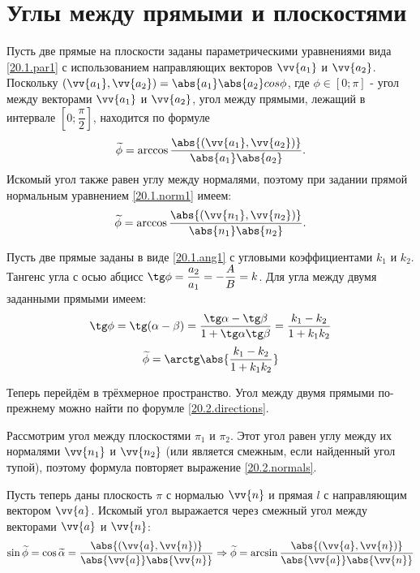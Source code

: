 \section{Углы между прямыми и плоскостями}

  Пусть две прямые на плоскости заданы параметрическими уравнениями вида \ref{20.1.par1} с использованием направляющих векторов $\vv{a_1}$ и $\vv{a_2}$. Поскольку $(\vv{a_1},\vv{a_2})=\abs{a_1}\abs{a_2}cos \phi$, где $\phi \in \left[0;\pi\right]$ - угол между векторами $\vv{a_1}$ и $\vv{a_2}$, угол между прямыми, лежащий в интервале $\left[0;\dfrac \pi 2\right]$, находится по формуле
  \begin{equation}\label{20.2.directions}
  \widetilde\phi=\arccos\dfrac{\abs{(\vv{a_1},\vv{a_2})}}{\abs{a_1}\abs{a_2}}.
  \end{equation}
  Искомый угол также равен углу между нормалями, поэтому при задании прямой нормальным уравнением \ref{20.1.norm1} имеем:
  \begin{equation}\label{20.2.normals}
  \widetilde\phi=\arccos\dfrac{\abs{(\vv{n_1},\vv{n_2})}}{\abs{n_1}\abs{n_2}}.
  \end{equation}
  
  Пусть две прямые заданы в виде \ref{20.1.ang1} с угловыми коэффициентами $k_1$ и $k_2$. Тангенс угла с осью абцисс $\tg \phi = \dfrac{a_2}{a_1}=-\dfrac{A}{B}=k$. Для угла между двумя заданными прямыми имеем:
  \begin{equation}
  \tg \phi=\tg (\alpha-\beta)=\dfrac{\tg \alpha - \tg \beta}{1+\tg \alpha \tg \beta}=\dfrac{k_1-k_2}{1+k_1k_2}
  \end{equation}
  \begin{equation}\label{20.2.angles}
  \widetilde \phi = \arctg \abs{\dfrac{k_1-k_2}{1+k_1k_2}}
  \end{equation}
  
  Теперь перейдём в трёхмерное пространство. Угол между двумя прямыми по-прежнему можно найти по форумле \ref{20.2.directions}. 
  
  Рассмотрим угол между плоскостями $\pi_1$ и $\pi_2$. Этот угол равен углу между их нормалями $\vv{n_1}$ и $\vv{n_2}$ (или является смежным, если найденный угол тупой), поэтому формула повторяет выражение \ref{20.2.normals}.
  
  Пусть теперь даны плоскость $\pi$ с нормалью $\vv{n}$ и прямая $l$ с направляющим вектором $\vv{a}$. Искомый угол выражается через смежный угол между векторами $\vv{a}$ и $\vv{n}$:
  \begin{equation}
  \sin  \widetilde \phi = \cos  \widetilde \alpha = \dfrac{\abs{(\vv{a},\vv{n})}}{\abs{\vv{a}} \abs{\vv{n}}} \Rightarrow
  \widetilde \phi = \arcsin \dfrac{\abs{(\vv{a},\vv{n})}}{\abs{\vv{a}} \abs{\vv{n}}}
  \end{equation}



